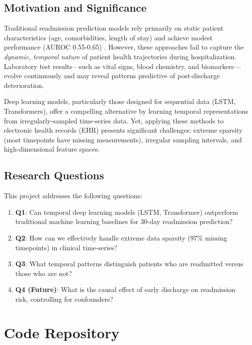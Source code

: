 \documentclass[conference]{IEEEtran}
\begin{document}
\subsection{Motivation and Significance}

Traditional readmission prediction models rely primarily on static patient characteristics (age, comorbidities, length of stay) and achieve modest performance (AUROC 0.55-0.65) \cite{kansagara2011}. However, these approaches fail to capture the \textit{dynamic, temporal nature} of patient health trajectories during hospitalization. Laboratory test results---such as vital signs, blood chemistry, and biomarkers---evolve continuously and may reveal patterns predictive of post-discharge deterioration.

Deep learning models, particularly those designed for sequential data (LSTM, Transformers), offer a compelling alternative by learning temporal representations from irregularly-sampled time-series data. Yet, applying these methods to electronic health records (EHR) presents significant challenges: extreme sparsity (most timepoints have missing measurements), irregular sampling intervals, and high-dimensional feature spaces.

\subsection{Research Questions}

This project addresses the following questions:

\begin{enumerate}
    \item \textbf{Q1}: Can temporal deep learning models (LSTM, Transformer) outperform traditional machine learning baselines for 30-day readmission prediction?
    \item \textbf{Q2}: How can we effectively handle extreme data sparsity (97\% missing timepoints) in clinical time-series?
    \item \textbf{Q3}: What temporal patterns distinguish patients who are readmitted versus those who are not?
    \item \textbf{Q4 (Future)}: What is the causal effect of early discharge on readmission risk, controlling for confounders?
\end{enumerate}

\section{Code Repository}
\end{document}
